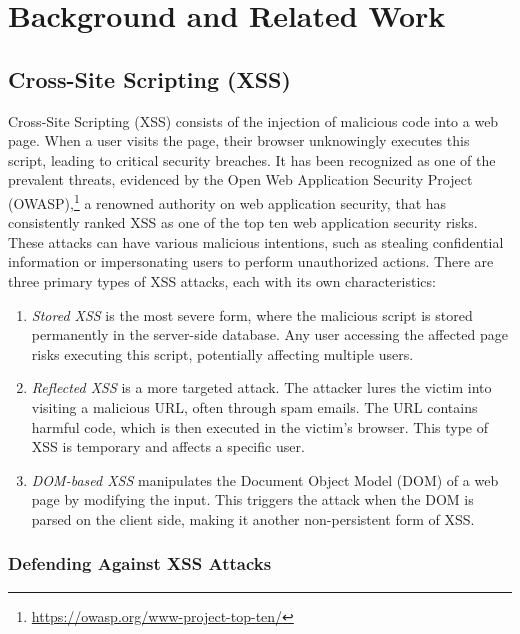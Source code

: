 \section{Background and Related Work}
\label{sec:backgroud}



\subsection{Cross-Site Scripting (XSS)}

Cross-Site Scripting (XSS) consists of the injection of malicious code into a web page. When a user visits the page, their browser unknowingly executes this script, leading to critical security breaches. It has been recognized as one of the prevalent threats, evidenced by the Open Web Application Security Project (OWASP),\footnote{\url{https://owasp.org/www-project-top-ten/}} a renowned authority on web application security, that has consistently ranked XSS as one of the top ten web application security risks. These attacks can have various malicious intentions, such as stealing confidential information or impersonating users to perform unauthorized actions. There are three primary types of XSS attacks, each with its own characteristics:
\begin{enumerate}

    \item \textit{Stored XSS} is the most severe form, where the malicious script is stored permanently in the server-side database. Any user accessing the affected page risks executing this script, potentially affecting multiple users.

    \item \textit{Reflected XSS} is a more targeted attack. The attacker lures the victim into visiting a malicious URL, often through spam emails. The URL contains harmful code, which is then executed in the victim's browser. This type of XSS is temporary and affects a specific user.

    \item \textit{DOM-based XSS} manipulates the Document Object Model (DOM) of a web page by modifying the input. This triggers the attack when the DOM is parsed on the client side, making it another non-persistent form of XSS.

\end{enumerate}




\subsubsection{Defending Against XSS Attacks}

